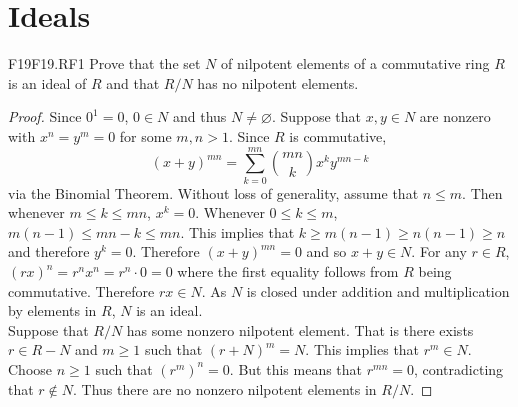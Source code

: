 \documentclass[../AlgebraQualSolutions.tex]{subfiles}
\begin{document}
\section{Ideals}

	\begin{prob}{F19}{F19.RF1}
	Prove that the set $N$ of nilpotent elements of a commutative ring $R$ is an ideal of $R$ and that $R/N$ has no nilpotent elements.
	\end{prob}
	
	\begin{proof}
	Since $0^1 = 0$, $0 \in N$ and thus $N \neq \varnothing$. Suppose that $x,y \in N$ are nonzero with $x^n = y^m = 0$ for some $m,n > 1$. Since $R$ is commutative,
		\[(x+y)^{mn} = \sum_{k=0}^{mn} {mn \choose k} x^k y^{mn - k} \]
	via the Binomial Theorem. Without loss of generality, assume that $n \leq m$. Then whenever $m \leq k \leq mn$, $x^k = 0$. Whenever $0 \leq k \leq m$, $m(n - 1) \leq mn - k \leq mn$. This implies that $k \geq m(n-1) \geq n(n-1) \geq n$ and therefore $y^k = 0$. Therefore $(x+y)^{mn} = 0$ and so $x + y \in N$. For any $r \in R$, $(rx)^n = r^nx^n = r^n \cdot 0 = 0$ where the first equality follows from $R$ being commutative. Therefore $rx \in N$. As $N$ is closed under addition and multiplication by elements in $R$, $N$ is an ideal.\\
	
	Suppose that $R/N$ has some nonzero nilpotent element. That is there exists $r \in R - N$ and $m \geq 1$ such that $(r+N)^m = N$. This implies that $r^m \in N$. Choose $n \geq 1$  such that $(r^m)^n = 0$. But this means that $r^{mn} = 0$, contradicting that $r \not\in N$. Thus there are no nonzero nilpotent elements in $R/N$.
	\end{proof}
\end{document}
